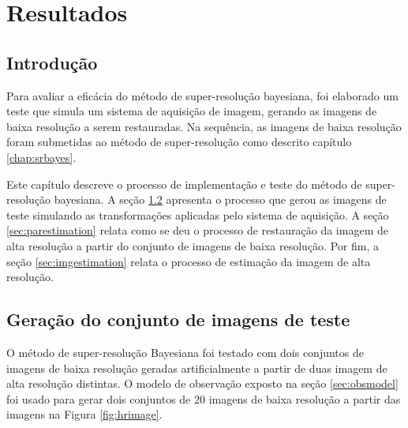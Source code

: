 \chapter{Resultados}
\label{chap:resultados}
\section{Introdução}
Para avaliar a eficácia do método de super-resolução bayesiana, 
foi elaborado um teste que simula um sistema de aquisição de imagem,
gerando as imagens de baixa resolução a serem restauradas.
Na sequência, as imagens de baixa resolução foram submetidas ao método de super-resolução como descrito capítulo \ref{chap:srbayes}.

Este capítulo descreve o processo de implementação e teste do método de super-resolução bayesiana.
A seção \ref{sec:gerimagens} apresenta o processo que gerou as imagens de teste simulando as transformações aplicadas pelo sistema de aquisição.
A seção \ref{sec:parestimation} relata como se deu o processo de restauração da imagem de alta resolução a partir do conjunto de imagens de baixa resolução.
Por fim, a seção \ref{sec:imgestimation} relata o processo de estimação da imagem de alta resolução.


\section{Geração do conjunto de imagens de teste}
\label{sec:gerimagens}

O método de super-resolução Bayesiana foi testado com dois conjuntos de imagens de
baixa resolução geradas artificialmente a partir de duas imagem de alta resolução
distintas.
O modelo de observação exposto na seção \ref{sec:obsmodel} foi usado para gerar dois conjuntos de 20 imagens de baixa resolução a partir das imagens na Figura \ref{fig:hrimage}.



